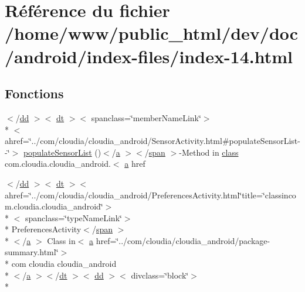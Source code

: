 \hypertarget{index-14_8html}{\section{Référence du fichier /home/www/public\-\_\-html/dev/doc/android/index-\/files/index-\/14.html}
\label{index-14_8html}
}
\subsection*{Fonctions}
\begin{DoxyCompactItemize}
\item 
$<$/\hyperlink{stylesheet_8css_a47f4718a86835a7771ec592ece845221}{dd} $>$$<$ \hyperlink{stylesheet_8css_a107565fb4039d33b041380d6e0ea1d80}{dt} $>$$<$ spanclass=\char`\"{}member\-Name\-Link\char`\"{}$>$\\*
$<$ ahref=\char`\"{}../com/cloudia/cloudia\-\_\-android/Sensor\-Activity.\-html\#populate\-Sensor\-List-\/-\/\char`\"{}$>$ \hyperlink{index-14_8html_a92fdac177df5c7c736cd6aff7fbcfa24}{populate\-Sensor\-List} ()$<$/\hyperlink{style_8css_a5e8981582017bb8b84c21f148345d1f7}{a} $>$$<$/\hyperlink{stylesheet_8css_a8343996ebcf16220b04e54659aac31cc}{span} $>$-\/Method in \hyperlink{_tools_8html_acf06f836132665ba8114f5a414c2403f}{class} com.\-cloudia.\-cloudia\-\_\-android.$<$ \hyperlink{style_8css_a5e8981582017bb8b84c21f148345d1f7}{a} href
\item 
$<$/\hyperlink{stylesheet_8css_a47f4718a86835a7771ec592ece845221}{dd} $>$$<$ \hyperlink{stylesheet_8css_a107565fb4039d33b041380d6e0ea1d80}{dt} $>$$<$ ahref=\char`\"{}../com/cloudia/cloudia\-\_\-android/Preferences\-Activity.\-html\char`\"{}title=\char`\"{}classincom.\-cloudia.\-cloudia\-\_\-android\char`\"{}$>$\\*
$<$ spanclass=\char`\"{}type\-Name\-Link\char`\"{}$>$\\*
 Preferences\-Activity$<$/\hyperlink{stylesheet_8css_a8343996ebcf16220b04e54659aac31cc}{span} $>$\\*
$<$/\hyperlink{style_8css_a5e8981582017bb8b84c21f148345d1f7}{a} $>$ Class in$<$ \hyperlink{style_8css_a5e8981582017bb8b84c21f148345d1f7}{a} href=\char`\"{}../com/cloudia/cloudia\-\_\-android/package-\/summary.\-html\char`\"{}$>$\\*
 com cloudia cloudia\-\_\-android\\*
$<$/\hyperlink{style_8css_a5e8981582017bb8b84c21f148345d1f7}{a} $>$$<$/\hyperlink{stylesheet_8css_a107565fb4039d33b041380d6e0ea1d80}{dt} $>$$<$ \hyperlink{stylesheet_8css_a47f4718a86835a7771ec592ece845221}{dd} $>$$<$ divclass=\char`\"{}block\char`\"{}$>$\\*

\end{DoxyCompactItemize}
